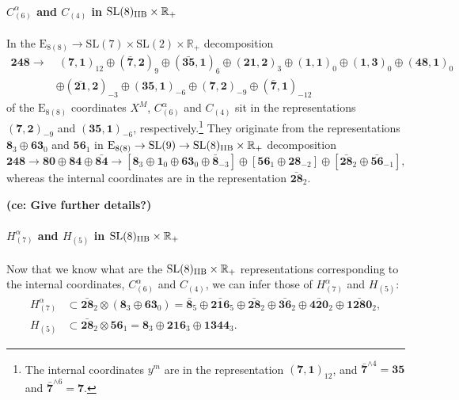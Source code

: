 \documentclass[11pt]{article}
\newcommand{\SL}{\ensuremath{\mathrm{SL}}\xspace}
\newcommand{\E}{\ensuremath{\mathrm{E}}\xspace}
\newcommand{\R}{\ensuremath{\mathbb{R}}\xspace}
\newcommand{\ce}[1]{\marginpar{\parbox{\marginparwidth}{\boldmath $\Longleftarrow$}}
{\boldmath\bfseries (ce: #1)}}
\begin{document}
\paragraph{\boldmath $C_{(6)}^{\alpha}$ and $C_{(4)}$ in $\SL(8)_{\rm IIB}\times\R_{+}$} In the $\E_{8(8)}\rightarrow\SL(7)\times\SL(2)\times\R_{+}$ decomposition
\begin{equation}
  \begin{aligned}
    \bm{248} \longrightarrow & \ (\bm{7},\bm{1})_{12} \oplus (\bm{\bar{7}},\bm{2})_{9} \oplus (\bm{\bar{35}},\bm{1})_{6} \oplus (\bm{21},\bm{2})_{3} \oplus (\bm{1},\bm{1})_{0} \oplus (\bm{1},\bm{3})_{0} \oplus (\bm{48},\bm{1})_{0} \\
    & \oplus (\bm{\bar{21}},\bm{2})_{-3} \oplus (\bm{35},\bm{1})_{-6} \oplus (\bm{7},\bm{2})_{-9} \oplus (\bm{\bar{7}},\bm{1})_{-12}
  \end{aligned} 
\end{equation}
of the $\E_{8(8)}$ coordinates $X^{M}$, $C_{(6)}^{\alpha}$ and $C_{(4)}$ sit in the representations $(\bm{7},\bm{2})_{-9}$ and $(\bm{35},\bm{1})_{-6}$, respectively.\footnote{The internal coordinates $y^{m}$ are in the representation $(\bm{7},\bm{1})_{12}$, and $\bm{\bar{7}}^{\wedge 4}=\bm{35}$ and $\bm{\bar{7}}^{\wedge 6}=\bm{7}$.} They originate from the representations $\bm{8}_{3}\oplus\bm{63}_{0}$ and $\bm{56}_{1}$ in $\E_{8(8)}\rightarrow\SL(9)\rightarrow\SL(8)_{\rm IIB}\times\R_{+}$ decomposition
\begin{equation}
  \bm{248} \longrightarrow \bm{80} \oplus \bm{84} \oplus \bm{\bar{84}} \longrightarrow \left[\bm{8}_{3} \oplus \bm{1}_{0} \oplus \bm{63}_{0} \oplus \bm{\bar{8}}_{-3}\right] \oplus \left[\bm{56}_{1} \oplus \bm{28}_{-2}\right] \oplus \left[\bm{\bar{28}}_{2} \oplus \bm{\bar{56}}_{-1}\right],
\end{equation}
whereas the internal coordinates are in the representation $\bm{\bar{28}}_{2}$.

\ce{Give further details?}

\paragraph{\boldmath $H_{(7)}^{\alpha}$ and $H_{(5)}$ in $\SL(8)_{\rm IIB}\times\R_{+}$} Now that we know what are the $\SL(8)_{\rm IIB}\times\R_{+}$ representations corresponding to the internal coordinates, $C_{(6)}^{\alpha}$ and $C_{(4)}$, we can infer those of $H_{(7)}^{\alpha}$ and $H_{(5)}$:
\begin{equation}  \label{eq:H7H5inIIB}
  \begin{aligned}
    H_{(7)}^{\alpha} & \subset \bm{\bar{28}}_{2} \otimes \left(\bm{8}_{3}\oplus\bm{63}_{0}\right) = \bm{\bar{8}}_{5} \oplus \bm{\bar{216}}_{5} \oplus \bm{\bar{28}}_{2} \oplus \bm{\bar{36}}_{2} \oplus \bm{\bar{420}}_{2} \oplus \bm{\bar{1280}}_{2}, \\
    H_{(5)} & \subset \bm{\bar{28}}_{2} \otimes \bm{56}_{1} = \bm{8}_{3} \oplus \bm{216}_{3} \oplus \bm{1344}_{3}.
  \end{aligned}
\end{equation}
\end{document}

